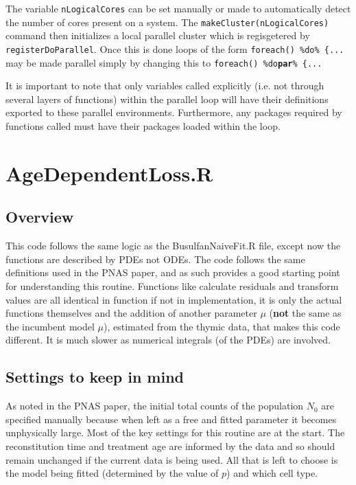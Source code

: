 \documentclass{tufte-book} %
\begin{document}
The variable \texttt{nLogicalCores} can be set manually or made to automatically detect the number of cores present on a system. The \texttt{makeCluster(nLogicalCores)} command then initializes a local parallel cluster which is regisgetered by \texttt{registerDoParallel}. Once this is done loops of the form \texttt{foreach() \%do\% \{...} may be made parallel simply by changing this to \texttt{foreach() \%do\textbf{par}\% \{...} 

It is important to note that only variables called explicitly (i.e. not through several layers of functions) within the parallel loop will have their definitions exported to these parallel environments. Furthermore, any packages required by functions called must have their packages loaded within the loop. %



\chapter{AgeDependentLoss.R}
\label{ch:3}


\section{Overview}

\begin{fullwidth}

This code follows the same logic as the BusulfanNaiveFit.R file, except now the functions are described by PDEs not ODEs. The code follows the same definitions used in the PNAS paper, and as such provides a good starting point for understanding this routine. Functions like calculate residuals and transform values are all identical in function if not in implementation, it is only the actual functions themselves and the addition of another parameter $\mu$ (\textbf{not} the same as the incumbent model $\mu$), estimated from the thymic data, that makes this code different. It is much slower as numerical integrals (of the PDEs) are involved.

\end{fullwidth}
\section{Settings to keep in mind}
As noted in the PNAS paper, the initial total counts of the population $N_0$ are specified manually because when left as a free and fitted parameter it becomes unphysically large.  Most of the key settings for this routine are at the start. The reconstitution time and treatment age are informed by the data and so should remain unchanged if the current data is being used. All that is left to choose is the model being fitted (determined by the value of $p$) and which cell type. 
\end{document}
